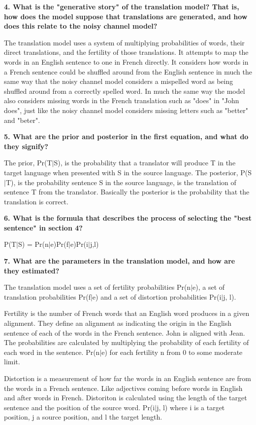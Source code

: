 \documentclass[11pt, oneside]{article}   	%
\begin{document}
\textbf{4. What is the "generative story" of the translation model? That is, how does the model suppose that translations are generated, and how does this relate to the noisy channel model?}

The translation model uses a system of multiplying probabilities of words, their direct translations, and the fertility of those translations. It attempts to map the words in an English sentence to one in French directly. It considers how words in a French sentence could be shuffled around from the English sentence in much the same way that the noisy channel model considers a mispelled word as being shuffled around from a correctly spelled word. In much the same way the model also considers missing words in the French translation such as "does" in "John does", just like the noisy channel model considers missing letters such as "better" and "beter". 

\textbf{5. What are the prior and posterior in the first equation, and what do they signify?}

The prior, Pr(T$|$S), is the probability that a translator will produce T in the target language when presented with S in the source language. The posterior, P(S$|$T), is the probability sentence S in the source language, is the translation of sentence T from the translator. Basically the posterior is the probability that the translation is correct. 
 
\textbf{6. What is the formula that describes the process of selecting the "best sentence" in section 4?}

P(T$|$S) = Pr(n$|$e)Pr(f$|$e)Pr(i$|$j,l)

\textbf{7. What are the parameters in the translation model, and how are they estimated?}

The translation model uses a set of fertility probabilities Pr(n$|$e), a set of translation probabilities Pr(f$|$e) and a set of distortion probabilities Pr(i$|$j, l). 

Fertility is the number of French words that an English word produces in a given alignment. They define an alignment as indicating the origin in the English sentence of each of the words in the French sentence. John is aligned with Jean. The probabilities are calculated by multiplying the probability of each fertility of each word in the sentence. Pr(n$|$e) for each fertility n from 0 to some moderate limit. 

Distortion is a measurement of how far the words in an English sentence are from the words in a French sentence. Like adjectives coming before words in English and after words in French. Distoriton is calculated using the length of the target sentence and the position of the source word. Pr(i$|$j, l) where i is a target position, j a source position, and l the target length. 
\end{document}
